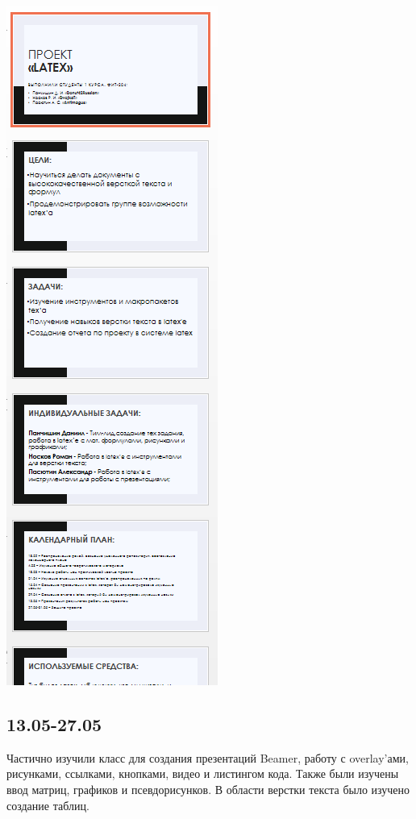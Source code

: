\documentclass{article}
\begin{document}
	
	\includegraphics{8}
	
	
	
	\subsection*{13.05-27.05}
	Частично изучили класс для создания презентаций Beamer, работу с overlay’ами, рисунками, ссылками, кнопками, видео и листингом кода. Также были изучены ввод матриц, графиков и псевдорисунков. В области верстки текста было изучено создание таблиц.
	
\end{document}
